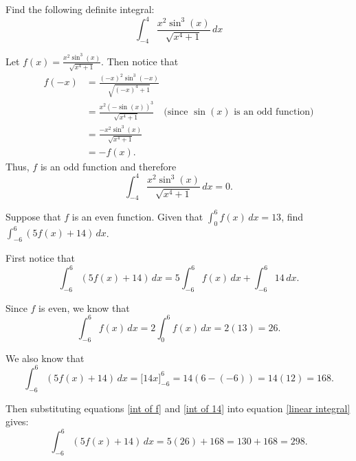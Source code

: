 \documentclass[handout, nooutcomes]{ximera}
\renewenvironment{freeResponse}{
\ifhandout\setbox0\vbox\bgroup\else
\begin{trivlist}\item[\hskip \labelsep\bfseries Solution:\hspace{2ex}]
\fi}
{\ifhandout\egroup\else
\end{trivlist}
\fi}
\renewcommand{\d}{\,d}
\newcommand{\eval}[1]{\bigg[ #1 \bigg]}
\begin{document}
\begin{problem}
  \mbox{}
  \begin{enumerate}
    \item
      Find the following definite integral:
	\begin{equation*}
          \int_{-4}^4 \frac{x^2 \sin^3(x)}{\sqrt{x^4 + 1}} \d x
	\end{equation*}
	\begin{freeResponse}
          Let $f(x) = \frac{x^2 \sin^3(x)}{\sqrt{x^4 + 1}}$.  
	  Then notice that
          \begin{align*}
            f(-x) &= \frac{(-x)^2 \sin^3(-x)}{\sqrt{(-x)^4 + 1}}  \\
                  &= \frac{x^2 (- \sin(x))^3}{\sqrt{x^4 + 1}}  \quad \text{(since } \sin(x) \text{ is an odd function)}  \\
                  &= \frac{- x^2 \sin^3(x)}{\sqrt{x^4 + 1}}  \\
                  &= -f(x).
          \end{align*}
          Thus, $f$ is an odd function and therefore
          \begin{equation*}
            \int_{-4}^4 \frac{x^2 \sin^3(x)}{\sqrt{x^4 + 1}} \d x = 0.
          \end{equation*}
	\end{freeResponse}
		
	\item
          Suppose that $f$ is an even function.
          Given that $\int_0^6 f(x) \d x = 13$, find $\int_{-6}^6 (5f(x) + 14) \d x$.
          \begin{freeResponse}
            First notice that
            \begin{equation}\label{linear integral}
              \int_{-6}^6 (5f(x) + 14) \d x = 5 \int_{-6}^6 f(x) \d x + \int_{-6}^6 14 \d x.
            \end{equation}
            
            Since $f$ is even, we know that
            \begin{equation}\label{int of f}
              \int_{-6}^6 f(x) \d x = 2 \int_0^6 f(x) \d x = 2 (13) = 26.
            \end{equation}
            
            We also know that
            \begin{equation}\label{int of 14}
              \int_{-6}^6 (5f(x) + 14) \d x = \eval{14x}_{-6}^6 = 14(6 - (-6)) = 14(12) = 168.
            \end{equation}
            
            Then substituting equations \eqref{int of f} and \eqref{int of 14} into equation \eqref{linear integral} gives:
            \begin{equation*}
              \int_{-6}^6 (5f(x) + 14) \d x = 5(26) + 168 = 130 + 168 = 298.
            \end{equation*}
          \end{freeResponse}
	\end{enumerate}
\end{problem}
\end{document}
